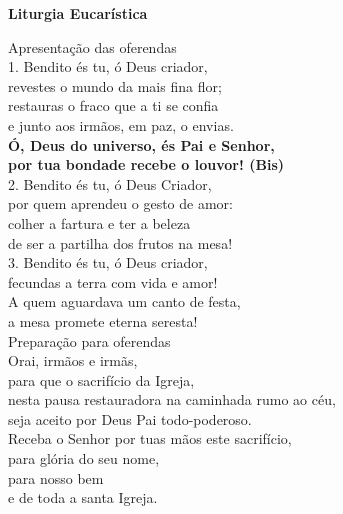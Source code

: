 \documentclass{book}
\begin{document}
\begin{center}
    \textbf{Liturgia Eucarística}
\end{center}
\begin{flushleft}
    \textcolor{VioletRed2}{Apresentação das oferendas}
    \vspace{.2cm} \\
    1. Bendito és tu, ó Deus criador, \\
    revestes o mundo da mais fina flor; \\
    restauras o fraco que a ti se confia \\
    e junto aos irmãos, em paz, o envias.
    \vspace{.2cm} \\
    \textbf{Ó, Deus do universo, és Pai e Senhor, \\ por tua bondade recebe o louvor! (Bis)}
    \vspace{.2cm} \\
    2. Bendito és tu, ó Deus Criador, \\
    por quem aprendeu o gesto de amor: \\
    colher a fartura e ter a beleza \\
    de ser a partilha dos frutos na mesa!
    \vspace{.2cm} \\
    3. Bendito és tu, ó Deus criador, \\
    fecundas a terra com vida e amor! \\
    A quem aguardava um canto de festa, \\
    a mesa promete eterna seresta!
    \vspace{.2cm} \\
    \textcolor{VioletRed2}{Preparação para oferendas}
    \vspace{.2cm} \\
    Orai, irmãos e irmãs, \\
    para que o sacrifício da Igreja, \\
    nesta pausa restauradora na caminhada rumo ao céu, \\
    seja aceito por Deus Pai todo-poderoso.
    \vspace{.2cm} \\
    Receba o Senhor por tuas mãos este sacrifício, \\
    para glória do seu nome, \\
    para nosso bem \\
    e de toda a santa Igreja.
    \vspace{.2cm} \\

\end{flushleft}
\end{document}

